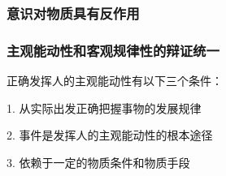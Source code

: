 \subsubsection{意识对物质具有反作用}%
\label{subsub:意识对物质具有反作用}

\subsubsection{主观能动性和客观规律性的辩证统一}%
\label{subsub:主观能动性和客观规律性的辩证统一}
正确发挥人的主观能动性有以下三个条件：

1. 从实际出发正确把握事物的发展规律

2. 事件是发挥人的主观能动性的根本途径

3. 依赖于一定的物质条件和物质手段
